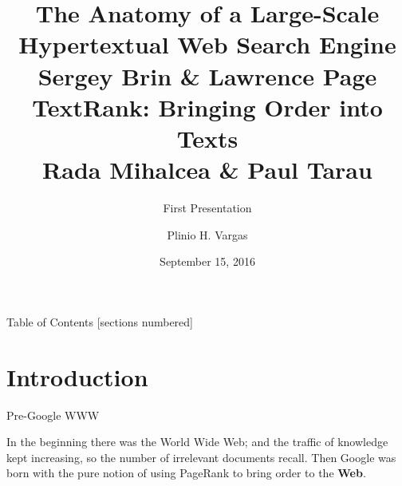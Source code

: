 \documentclass[10pt]{beamer}
\title{The Anatomy of a Large-Scale\\Hypertextual
Web Search Engine\\ {\small Sergey Brin \& Lawrence Page}\\TextRank: Bringing Order into Texts\\\small{Rada Mihalcea \& Paul Tarau}}
\subtitle{First Presentation}
\date{September 15, 2016}
\author{Plinio H. Vargas}
\institute{Old Dominion University\\Intro to Information Retrieval\\CS734/834}
\begin{document}
\maketitle
\begin{frame}{Table of Contents}
  [sections numbered]
  \tableofcontents[hideallsubsections]
\end{frame}
\section{Introduction}

\begin{frame}[fragile]{Pre-Google WWW}

  In the beginning there was the \alert{World Wide Web}; and the traffic of knowledge kept increasing, so the number of irrelevant documents recall. Then \alert{Google} was born with the pure notion of using PageRank to bring order to the \textbf{Web}.

\end{frame}
\end{document}
